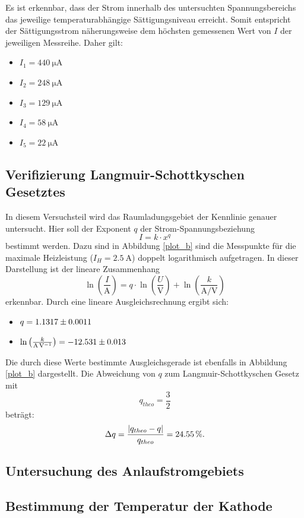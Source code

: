 \documentclass[11pt,ngerman,a4paper]{article}
\begin{document}
\noindent
Es ist erkennbar, dass der Strom innerhalb des untersuchten Spannungsbereichs das jeweilige temperaturabhängige Sättigungsniveau erreicht. Somit entspricht der Sättigungsstrom näherungsweise dem höchsten gemessenen Wert von $I$ der jeweiligen Messreihe. Daher gilt:
\begin{itemize}
\item $I_1 = \SI{440}{\micro\ampere}$
\item $I_2 = \SI{248}{\micro\ampere}$
\item $I_3 = \SI{129}{\micro\ampere}$
\item $I_4 = \SI{58}{\micro\ampere}$
\item $I_5 = \SI{22}{\micro\ampere}$
\end{itemize}

\subsection{Verifizierung Langmuir-Schottkyschen Gesetztes}
In diesem Versuchsteil wird das Raumladungsgebiet der Kennlinie genauer untersucht.
Hier soll der Exponent $q$ der Strom-Spannungsbeziehung 
\[
I = k\cdot x^q
\]
bestimmt werden. Dazu sind in Abbildung \ref{plot_b} sind die Messpunkte für die maximale Heizleistung ($I_H = \SI{2.5}{\ampere}$) doppelt logarithmisch aufgetragen. In dieser Darstellung ist der lineare Zusammenhang
\[
\ln\left(\frac{I}{\si{\ampere}}\right) = q\cdot \ln\left(\frac{U}{\si{\volt}}\right)+ \ln\left(\frac{k}{\si{\ampere\per\volt}}\right)
\]
erkennbar. Durch eine lineare Ausgleichsrechnung ergibt sich:
\begin{itemize}
\item $q = \num{1.1317+-0.0011}$
\item $\ln\left(\frac{k}{\si{\ampere\per\volt}}\right) = \num{-12.531+-0.013}$ 
\end{itemize}
Die durch diese Werte bestimmte Ausgleichsgerade ist ebenfalls in Abbildung \ref{plot_b} dargestellt.
Die Abweichung von $q$ zum Langmuir-Schottkyschen Gesetz mit 
\[
q_{theo} = \frac32
\]
beträgt:
\[
\Delta q = \frac{|q_{theo}-q|}{q_{theo}} = \SI{24.55}{\percent}\rm.
\]
\subsection{Untersuchung des Anlaufstromgebiets}
\subsection{Bestimmung der Temperatur der Kathode}
\end{document}
